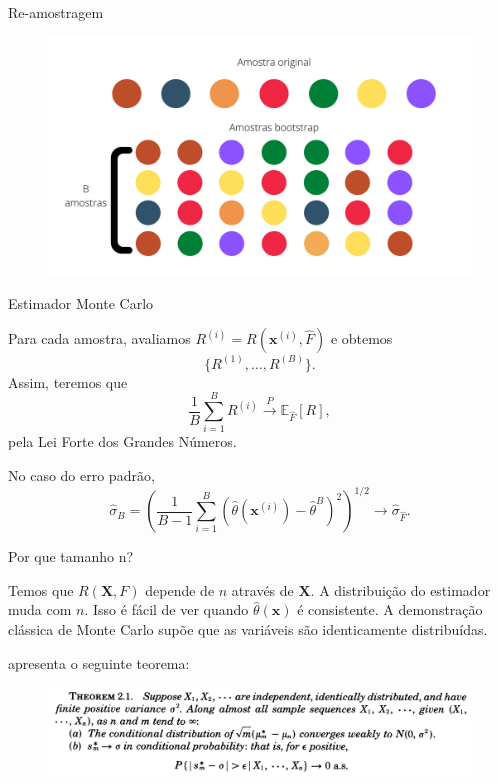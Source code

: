 \documentclass{beamer}
\newcommand{\ev}{\mathbb{E}}
\begin{document}
\begin{frame}{Re-amostragem}

    \begin{figure}
        \includegraphics[width=\textwidth]{bootstrap.png}
    \end{figure}
    
\end{frame}

\begin{frame}{Estimador Monte Carlo}

    Para cada amostra, avaliamos $R^{(i)} = R(\boldsymbol{x}^{(i)},
\hat{F})$ e obtemos 
$$\{R^{(1)}, \dots, R^{(B)}\}.$$ 
Assim, teremos que 
$$
\frac{1}{B}\sum_{i=1}^B R^{(i)} \overset{P}{\to} \ev_{\hat{F}}[R], 
$$
pela Lei Forte dos Grandes Números. 

\bigskip\pause

No caso do erro padrão, 
$$
\hat{\sigma}_B = \left(\frac{1}{B-1}\sum_{i=1}^B (\hat{\theta}(\boldsymbol{x}^{(i)}) - \hat{\theta}^B)^2\right)^{1/2} \to \hat{\sigma}_{\hat{F}}.
$$

\end{frame}

\begin{frame}{Por que tamanho n?}

    Temos que $R(\boldsymbol{X}, F)$ depende de $n$ através de
    $\boldsymbol{X}$. A distribuição do estimador muda com $n$. Isso é fácil
    de ver quando $\hat{\theta}(\boldsymbol{x})$ é consistente. A demonstração
    clássica de Monte Carlo supõe que as variáveis são identicamente
    distribuídas.

    \bigskip\pause 

    \cite[]{bickel1981some} apresenta o seguinte teorema:

    \begin{figure}
        \centering
        \includegraphics[width=\textwidth]{theorem-bickel}
    \end{figure}

\end{frame}
\end{document}
